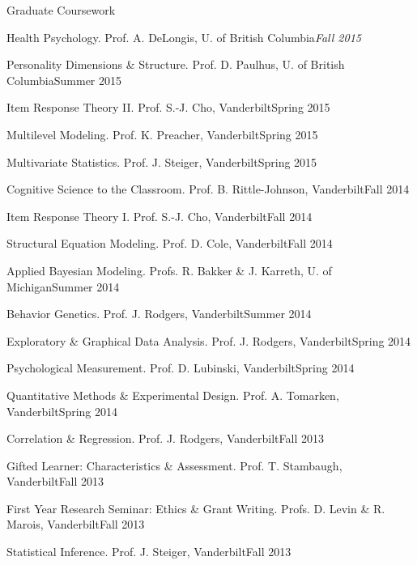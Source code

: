 \documentclass {resume}
\newlength{\wideitemsep}
\let\olditem\item
\renewcommand{\item}{\setlength{\itemsep}{\wideitemsep}\olditem}
\begin{document}
\begin{rSection}{\textrm{Graduate Coursework}}
\begin{etaremune}
\item Health Psychology.  Prof. A. DeLongis, U. of British Columbia\hfill  {\textit{Fall 2015}}
\item Personality Dimensions \& Structure.  Prof. D. Paulhus, U. of British Columbia\hfill  {Summer 2015}
\item Item Response Theory \textrm{II}. Prof. S.-J. Cho, Vanderbilt\hfill  {Spring 2015}
\item Multilevel Modeling. Prof. K. Preacher, Vanderbilt\hfill  {Spring 2015}
\item Multivariate Statistics. Prof. J. Steiger, Vanderbilt\hfill  {Spring 2015}
\item Cognitive Science to the Classroom. Prof. B. Rittle-Johnson, Vanderbilt\hfill  {Fall 2014}
\item Item Response Theory \textrm{I}. Prof. S.-J. Cho, Vanderbilt\hfill  {Fall 2014}
\item Structural Equation Modeling. Prof. D. Cole, Vanderbilt\hfill  {Fall 2014}
\item Applied Bayesian Modeling. Profs. R. Bakker \& J. Karreth, U. of Michigan\hfill  {Summer 2014}
\item Behavior Genetics. Prof. J. Rodgers, Vanderbilt\hfill  {Summer 2014}
\item Exploratory \& Graphical Data Analysis. Prof. J. Rodgers, Vanderbilt\hfill  {Spring 2014}
\item Psychological Measurement. Prof. D. Lubinski, Vanderbilt\hfill  {Spring 2014}
\item Quantitative Methods \& Experimental Design. Prof. A. Tomarken, Vanderbilt\hfill  {Spring 2014}
\item Correlation \& Regression. Prof. J. Rodgers, Vanderbilt\hfill  {Fall 2013}
\item Gifted Learner: Characteristics \& Assessment. Prof. T. Stambaugh, Vanderbilt\hfill  {Fall 2013}
\item First Year Research Seminar: Ethics \& Grant Writing. Profs. D. Levin \& R. Marois, Vanderbilt\hfill  {Fall 2013}
\item Statistical Inference. Prof. J. Steiger, Vanderbilt\hfill  {Fall 2013}

\end{etaremune}
\end{rSection}
\end{document}
